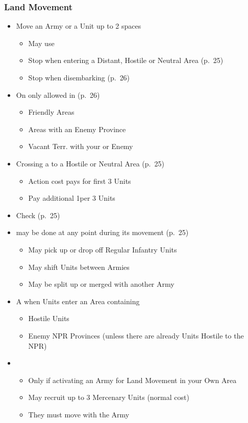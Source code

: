 \documentclass[10pt]{article}
\begin{document}
\subsubsection*{Land Movement}
\begin{itemize}
	\item Move an Army or a Unit up to 2 spaces
	\begin{itemize}
		\item May use 
		\item Stop when entering a Distant, Hostile or Neutral Area (p.~25)
		\item Stop when disembarking (p.~26)
	\end{itemize}
	\item On  only allowed in (p.~26)
	\begin{itemize}
		\item Friendly Areas
		\item Areas with an Enemy Province
		\item Vacant Terr. with your or Enemy \claim
	\end{itemize}
	\item Crossing a  to a Hostile or Neutral Area (p.~25)
	\begin{itemize}
		\item Action cost pays for first 3 Units
		\item Pay additional 1\milpower per 3 Units
	\end{itemize}
	\item Check  (p.~25)
	\item {} may be done at any point during its movement (p.~25)
	\begin{itemize}
		\item May pick up or drop off Regular Infantry Units
		\item May shift Units between Armies
		\item May be split up or merged with another Army
	\end{itemize}
	\item A  when Units enter an Area containing
	\begin{itemize}
		\item Hostile Units
		\item Enemy NPR Provinces (unless there are already Units Hostile to the NPR)
	\end{itemize}
	\item {}
	\begin{itemize}
		\item Only if activating an Army for Land Movement in your Own Area
		\item May recruit up to 3 Mercenary Units (normal cost)
		\item They must move with the Army
	\end{itemize}
\end{itemize}
\end{document}
